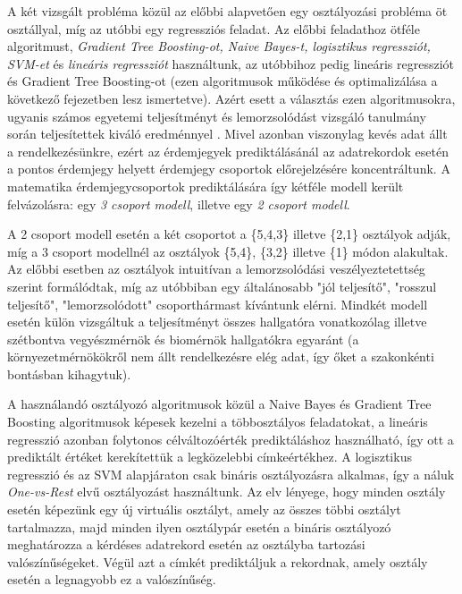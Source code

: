 \documentclass[12pt]{article}
\begin{document}
A két vizsgált probléma közül az előbbi alapvetően egy osztályozási probléma öt osztállyal, míg az utóbbi egy regressziós feladat. Az előbbi feladathoz ötféle algoritmust, \textit{Gradient Tree Boosting-ot, Naive Bayes-t, logisztikus regressziót, SVM-et} és \textit{lineáris regressziót} használtunk, az utóbbihoz pedig lineáris regressziót és Gradient Tree Boosting-ot (ezen algoritmusok működése és optimalizálása a következő fejezetben lesz ismertetve). Azért esett a választás ezen algoritmusokra, ugyanis számos egyetemi teljesítményt és lemorzsolódást vizsgáló tanulmány során teljesítettek kiváló eredménnyel \cite{modeling1, modeling2, modeling3, modeling4}. Mivel azonban viszonylag kevés adat állt a rendelkezésünkre, ezért az érdemjegyek prediktálásánál az adatrekordok esetén a pontos érdemjegy helyett érdemjegy csoportok előrejelzésére koncentráltunk. A matematika érdemjegycsoportok prediktálására így kétféle modell került felvázolásra: egy \textit{3 csoport modell}, illetve egy \textit{2 csoport modell}.

A 2 csoport modell esetén a két csoportot a \{5,4,3\} illetve \{2,1\} osztályok adják, míg a 3 csoport modellnél az osztályok \{5,4\}, \{3,2\} illetve \{1\} módon alakultak. Az előbbi esetben az osztályok intuitívan a lemorzsolódási veszélyeztetettség szerint formálódtak, míg az utóbbiban egy általánosabb "jól teljesítő", "rosszul teljesítő", "lemorzsolódott" csoporthármast kívántunk elérni. Mindkét modell esetén külön vizsgáltuk a teljesítményt összes hallgatóra vonatkozólag illetve szétbontva vegyészmérnök és biomérnök hallgatókra egyaránt (a környezetmérnökökről nem állt rendelkezésre elég adat, így őket a szakonkénti bontásban kihagytuk).

A használandó osztályozó algoritmusok közül a Naive Bayes és Gradient Tree Boosting algoritmusok képesek kezelni a többosztályos feladatokat, a lineáris regresszió azonban folytonos célváltozóérték prediktáláshoz használható, így ott a prediktált értéket kerekítettük a legközelebbi címkeértékhez. A logisztikus regresszió és az SVM alapjáraton csak bináris osztályozásra alkalmas, így a náluk \textit{One-vs-Rest} elvű osztályozást használtunk. Az elv lényege, hogy minden osztály esetén képezünk egy új virtuális osztályt, amely az összes többi osztályt tartalmazza, majd minden ilyen osztálypár esetén a bináris osztályozó meghatározza a kérdéses adatrekord esetén az osztályba tartozási valószínűségeket. Végül azt a címkét prediktáljuk a rekordnak, amely osztály esetén a legnagyobb ez a valószínűség. 
\end{document}
